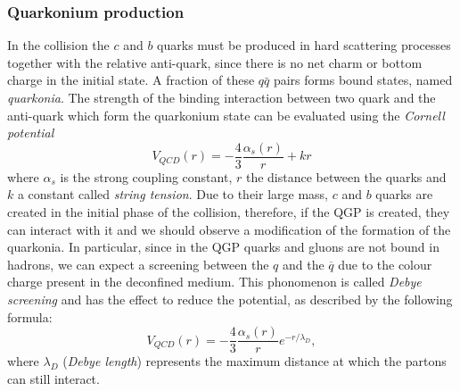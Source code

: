 \documentclass[b5paper,10pt,twoside,oldstyle,classica]{toptesi}
\begin{document}
\subsubsection{Quarkonium production}
In the collision the $c$ and $b$ quarks must be produced in hard scattering processes together with the relative anti-quark, since there is no net charm or bottom charge in the initial state. A fraction of these $q\bar{q}$ pairs forms bound states, named \textit{quarkonia}. The strength of the binding interaction between two quark and the anti-quark which form the quarkonium state can be evaluated using the \textit{Cornell potential} 
\begin{equation}
 V_{QCD} (r) = -\frac{4}{3}\frac{\alpha_s(r)}{r}+kr
\end{equation}
where $\alpha_s$ is the strong coupling constant, $r$ the distance between the quarks and $k$ a constant called \textit{string tension}.
Due to their large mass, $c$ and $b$ quarks are created in the initial phase of the collision, therefore, if the QGP is created, they can interact with it and we should observe a modification of the formation of the quarkonia. In particular, since in the QGP quarks and gluons are not bound in hadrons, we can expect a screening between the $q$ and the $\overline{q}$ due to the colour charge present in the deconfined medium. This phonomenon is called \textit{Debye screening} and has the effect to reduce the potential, as described by the following formula:
\begin{equation}
 V_{QCD} (r) = -\frac{4}{3}\frac{\alpha_s(r)}{r}e^{-r/\lambda_D},
\end{equation}
where $\lambda_D$ (\textit{Debye length}) represents the maximum distance at which the partons can still interact.
\end{document}
